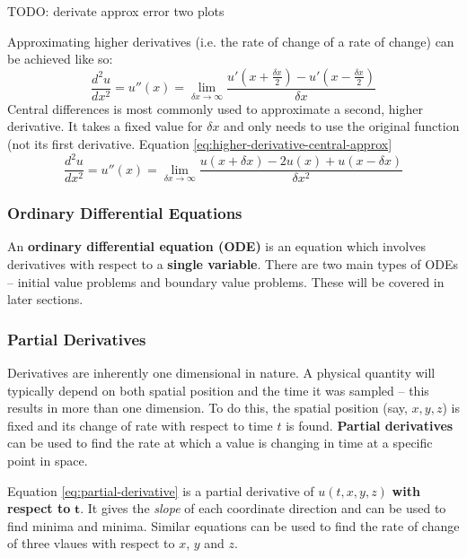 \documentclass{article}
\begin{document}
TODO: derivate approx error two plots

Approximating higher derivatives (i.e. the rate of change of a rate of change) can be achieved like so:
\begin{equation}
	\frac{d^2u}{dx^2} = u''(x) = \lim_{\delta x \rightarrow \infty} \frac{u'(x + \frac{\delta x}{2}) - u'(x - \frac{\delta x}{2})}{\delta x}
	\label{eq:higher-derivative-approx}
\end{equation}
Central differences is most commonly used to approximate a second, higher derivative. It takes a fixed value for $\delta x$ and only needs to use the original function (not its first derivative. Equation \ref{eq:higher-derivative-central-approx}
\begin{equation}
	\frac{d^2u}{dx^2} = u''(x) = \lim_{\delta x \rightarrow \infty} \frac{u(x + \delta x) - 2u(x) + u(x - \delta x)}{\delta x^2}
	\label{eq:higher-derivative-central-approx}
\end{equation}

\subsubsection{Ordinary Differential Equations}

An \textbf{ordinary differential equation (ODE)} is an equation which involves derivatives with respect to a \textbf{single variable}. There are two main types of ODEs -- initial value problems and boundary value problems. These will be covered in later sections.

\subsubsection{Partial Derivatives}

Derivatives are inherently one dimensional in nature. A physical quantity will typically depend on both spatial position and the time it was sampled -- this results in more than one dimension.  To do this, the spatial position (say, $x, y, z$) is fixed and its change of rate with respect to time $t$ is found. \textbf{Partial derivatives} can be used to find the rate at which a value is changing in time at a specific point in space.

Equation \ref{eq:partial-derivative} is a partial derivative of $u(t, x, y, z)$ \textbf{with respect to }$\mathbf{t}$. It gives the \textit{slope} of each coordinate direction and can be used to find minima and minima. Similar equations can be used to find the rate of change of three vlaues with respect to $x$, $y$ and $z$.
\end{document}
